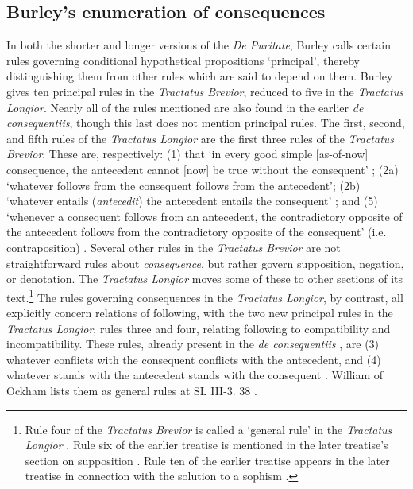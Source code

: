 	\subsection{Burley's enumeration of consequences}
	In both the shorter and longer versions of the \textit{De Puritate}, Burley calls certain rules governing conditional hypothetical propositions `principal', thereby distinguishing them from other rules which are said to depend on them. Burley gives ten principal rules in the \textit{Tractatus Brevior}, reduced to five in the \textit{Tractatus Longior}. Nearly all of the rules mentioned are also found in the earlier \textit{de consequentiis}, though this last does not mention principal rules. The first, second, and fifth rules of the \textit{Tractatus Longior} are the first three rules of the \textit{Tractatus Brevior}. These are, respectively: (1) that `in every good simple [as-of-now] consequence, the antecedent cannot [now] be true without the consequent' \autocite[p. 61.30-37, 199.26-27]{BurleyDPAL}; (2a) `whatever follows from the consequent follows from the antecedent'; (2b) `whatever entails (\textit{antecedit}) the antecedent entails the consequent' \autocite[p. 62, 9-13]{BurleyDPAL}; and (5) `whenever a consequent follows from an antecedent, the contradictory opposite of the antecedent follows from the contradictory opposite of the consequent' (i.e. contraposition) \autocite[p. 64.20-22]{BurleyDPAL}. Several other rules in the \textit{Tractatus Brevior} are not straightforward rules about \textit{consequence}, but rather govern supposition, negation, or denotation. The \textit{Tractatus Longior} moves some of these to other sections of its text.\footnote{Rule four of the \textit{Tractatus Brevior} \autocite[p. 208.12-13]{BurleyDPAL} is called a `general rule' in the \textit{Tractatus Longior} \autocite[p. 73.29]{BurleyDPAL}. Rule six of the earlier treatise \autocite[p. 210.11-12]{BurleyDPAL} is mentioned in the later treatise's section on supposition \autocite[27.11]{BurleyDPAL}. Rule ten of the earlier treatise \autocite[p. 219.1-2]{BurleyDPAL} appears in the later treatise in connection with the solution to a sophism \autocite[p. 141.26-30]{BurleyDPAL}.} The rules governing consequences in the \textit{Tractatus Longior}, by contrast, all explicitly concern relations of following, with the two new principal rules in the \textit{Tractatus Longior}, rules three and four, relating following to compatibility and incompatibility. These rules, already present in the \textit{de consequentiis} \autocite[p. 133, par. 88]{Green-Pedersen1980b}, are (3) whatever conflicts with the consequent conflicts with the antecedent, and (4) whatever stands with the antecedent stands with the consequent \autocite[pp. 63.7-10, 64.20-22]{BurleyDPAL}. William of Ockham lists them as general rules at SL III-3. 38 \autocite[III-3.38, pp. 727-731]{OckhamSL}.
	
